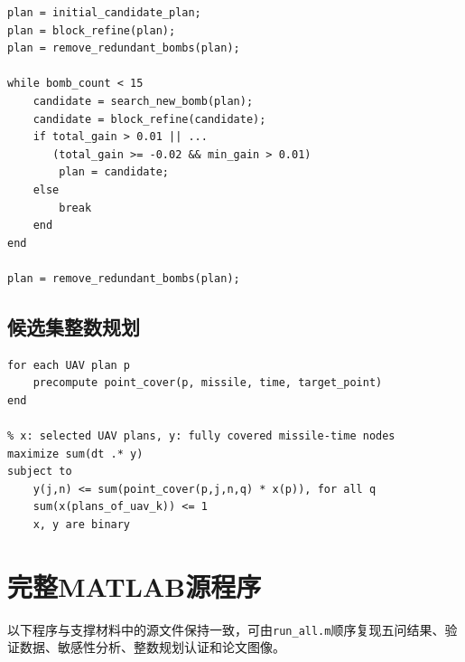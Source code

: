 \documentclass[12pt,a4paper]{ctexart}
\begin{document}
\begin{lstlisting}
plan = initial_candidate_plan;
plan = block_refine(plan);
plan = remove_redundant_bombs(plan);

while bomb_count < 15
    candidate = search_new_bomb(plan);
    candidate = block_refine(candidate);
    if total_gain > 0.01 || ...
       (total_gain >= -0.02 && min_gain > 0.01)
        plan = candidate;
    else
        break
    end
end

plan = remove_redundant_bombs(plan);
\end{lstlisting}

\subsection{候选集整数规划}

\begin{lstlisting}
for each UAV plan p
    precompute point_cover(p, missile, time, target_point)
end

% x: selected UAV plans, y: fully covered missile-time nodes
maximize sum(dt .* y)
subject to
    y(j,n) <= sum(point_cover(p,j,n,q) * x(p)), for all q
    sum(x(plans_of_uav_k)) <= 1
    x, y are binary
\end{lstlisting}

\section{完整MATLAB源程序}

以下程序与支撑材料中的源文件保持一致，可由\texttt{run\_all.m}顺序复现五问结果、验证数据、敏感性分析、整数规划认证和论文图像。
\end{document}
